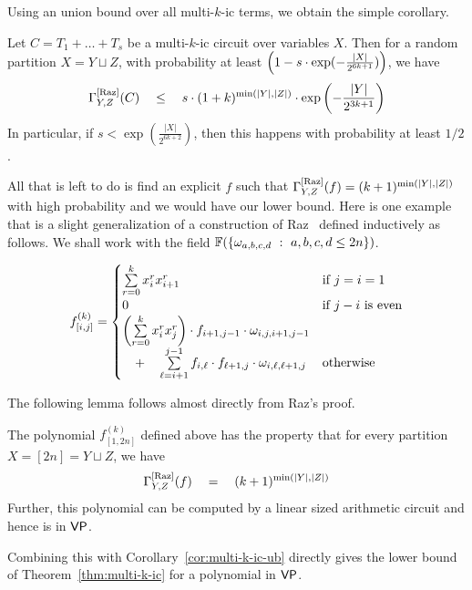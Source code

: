 \noindent
Using an union bound over all multi-$k$-ic terms, we obtain the simple corollary. 

\begin{corollary}\label{cor:multi-k-ic-ub}
Let $C = T_1 + \dots + T_s$ be a multi-$k$-ic circuit over variables $X$. Then for a random partition $X = Y \sqcup Z$, with probability at least $\left(1 - s  \cdot \exp(-\frac{|X|}{2^{6k+1}})\right)$, we have
\[
\Gamma^{\mathrm{[Raz]}}_{Y,Z}(C) \quad \leq \quad s \cdot (1+k)^{\min(|Y|,|Z|)}\cdot \exp\left(-\frac{|Y|}{2^{3k+1}}\right)
\]
In particular, if $s < \exp(\frac{|X|}{2^{6k+2}})$, then this happens with probability at least $1/2$. 
\end{corollary}

All that is left to do is find an explicit $f$ such that $\Gamma^{\mathrm{[Raz]}}_{Y,Z}(f) = (k+1)^{\min(|Y|,|Z|)}$ with high probability and we would have our lower bound. Here is one example that is a slight generalization of a construction of Raz~\cite{Raz06} defined inductively as follows. We shall work with the field $\mathbb{F}(\left\{{\omega_{a,b,c,d}}\ : \ {a,b,c,d\leq 2n}\right\})$. 

\[
f_{[i,j]}^{(k)} =  \begin{cases}
 \sum\limits_{r=0}^k x_i^r x_{i+1}^r & \text{if $j = i=1$}\\
 0  & \text{if $j -i$ is even}\\
 \left(\sum\limits_{r=0}^k x_i^r x_{j}^r\right) \cdot f_{i+1,j-1} \cdot \omega_{i,j,i+1,j-1} & \\
 \quad + \quad \sum\limits_{\ell=i+1}^{j-1} f_{i,\ell} \cdot f_{\ell+1,j} \cdot \omega_{i,\ell,\ell+1,j} & \text{otherwise} 
\end{cases}
\]

The following lemma follows almost directly from Raz's proof. 

\begin{lemma}
The polynomial $f_{[1,2n]}^{(k)}$ defined above has the property that for every partition $X = [2n] = Y \sqcup Z$, we have
\[
\Gamma^{\mathrm{[Raz]}}_{Y,Z}(f) \quad = \quad (k+1)^{\min(|Y|,|Z|)}
\]
Further, this polynomial can be computed by a linear sized arithmetic circuit and hence is in $\mathsf{VP}$. 
\end{lemma}

Combining this with Corollary~\ref{cor:multi-k-ic-ub} directly gives the lower bound of Theorem~\ref{thm:multi-k-ic} for a polynomial in $\mathsf{VP}$. 

